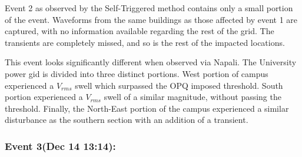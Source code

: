 Event 2 as observed by the Self-Triggered method contains only a small portion of the event.
Waveforms from the same buildings as those affected by event 1 are captured, with no information available regarding the rest of the grid.
The transients are completely missed, and so is the rest of the impacted
locations.

This event looks significantly different when observed via Napali.
The University power gid is divided into three distinct portions.
West portion of campus experienced a $V_{rms}$ swell which surpassed the OPQ imposed threshold.
South portion experienced a $V_{rms}$ swell of a similar magnitude, without passing the threshold.
Finally, the North-East portion of the campus experienced a similar disturbance as the southern section with an addition of a transient.

\subsubsection{Event 3(Dec 14 13:14):}

